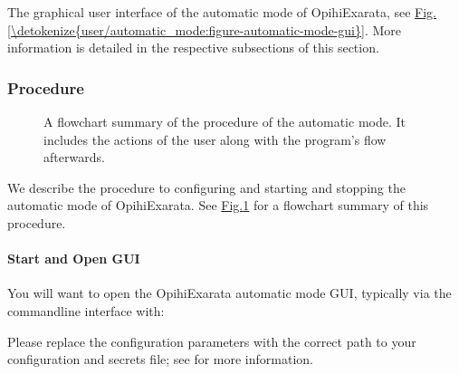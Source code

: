 \documentclass[letterpaper,11pt,english]{sphinxmanual}
\begin{document}
\sphinxAtStartPar
The graphical user interface of the automatic mode of OpihiExarata, see
\hyperref[\detokenize{user/automatic_mode:figure-automatic-mode-gui}]{Fig.\@ \ref{\detokenize{user/automatic_mode:figure-automatic-mode-gui}}}. More information is detailed in the
respective subsections of this section.


\subsubsection{Procedure}
\label{\detokenize{user/automatic_mode:procedure}}
\begin{figure}[htbp]
\centering
\capstart

\noindent{}
\caption{A flowchart summary of the procedure of the automatic mode. It includes
the actions of the user along with the program’s flow afterwards.}\label{\detokenize{user/automatic_mode:id2}}\label{\detokenize{user/automatic_mode:figure-automatic-mode-flowchart}}\end{figure}

\sphinxAtStartPar
We describe the procedure to configuring and starting and stopping the
automatic mode of OpihiExarata. See \hyperref[\detokenize{user/automatic_mode:figure-automatic-mode-flowchart}]{Fig.\@ \ref{\detokenize{user/automatic_mode:figure-automatic-mode-flowchart}}}
for a flowchart summary of this procedure.


\paragraph{Start and Open GUI}
\label{\detokenize{user/automatic_mode:start-and-open-gui}}
\sphinxAtStartPar
You will want to open the OpihiExarata automatic mode GUI, typically via the
command\sphinxhyphen{}line interface with:

\begin{sphinxVerbatim}[commandchars=\\\{\}]
   
\end{sphinxVerbatim}

\sphinxAtStartPar
Please replace the configuration parameters with the correct path to your
configuration and secrets file; see {\hyperref[\detokenize{user/configuration:user-configuration}]{}} for more
information.
\end{document}
